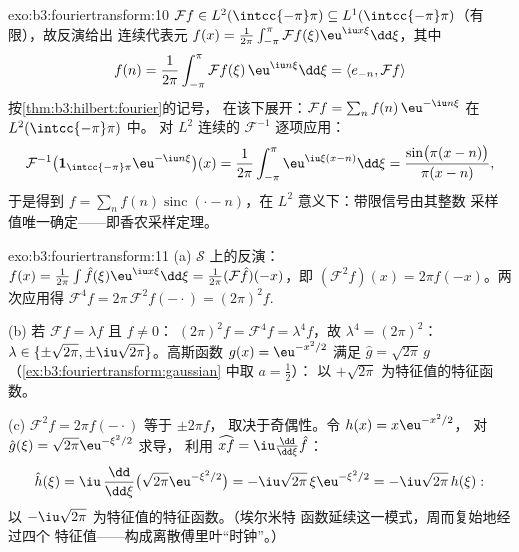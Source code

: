 \begin{solution}{exo:b3:fouriertransform:10}
$\mathcal Ff \in L^2(\intcc{-\pi}\pi) \subseteq
L^1(\intcc{-\pi}\pi)$（有限），故反演给出
连续代表元 $f(x) =
\frac1{2\pi}\int_{-\pi}^\pi\mathcal Ff(\xi)\eu^{\iu
x\xi}\dd\xi$，其中
\[
f(n) = \frac1{2\pi}\int_{-\pi}^{\pi}\mathcal
Ff(\xi)\,\eu^{\iu n\xi}\dd\xi = \langle e_{-n}, \mathcal
Ff\rangle
\]
按\cref{thm:b3:hilbert:fourier}的记号，
在该下展开：$\mathcal Ff = \sum_nf(n)\,\eu^{-\iu
n\xi}$ 在 $L^2(\intcc{-\pi}\pi)$ 中。
对 $L^2$ 连续的 $\mathcal F^{-1}$ 逐项应用：
\[
\mathcal F^{-1}\bigl(\mathbf
1_{\intcc{-\pi}\pi}\eu^{-\iu n\xi}\bigr)(x)
= \frac1{2\pi}\int_{-\pi}^{\pi}\eu^{\iu\xi(x - n)}\dd\xi
= \frac{\sin\bigl(\pi(x-n)\bigr)}{\pi(x - n)} ,
\]
于是得到 $f = \sum_nf(n)\operatorname{sinc}(\cdot - n)$，在
$L^2$ 意义下：带限信号由其整数
采样值唯一确定——即香农采样定理。
\end{solution}

\begin{solution}{exo:b3:fouriertransform:11}
(a) $\mathcal S$ 上的反演：$f(x) =
\frac1{2\pi}\int\hat f(\xi)\eu^{\iu x\xi}\dd\xi =
\frac1{2\pi}(\mathcal F\hat f)(-x)$，即 $(\mathcal
F^2f)(x) = 2\pi f(-x)$。两次应用得 $\mathcal F^4f =
2\pi\,\mathcal F^2f(-\cdot) = (2\pi)^2f$.

(b) 若 $\mathcal Ff = \lambda f$ 且 $f \neq 0$：
$(2\pi)^2f = \mathcal F^4f = \lambda^4f$，故 $\lambda^4 =
(2\pi)^2$：$\lambda \in \{\pm\sqrt{2\pi},
\pm\iu\sqrt{2\pi}\}$。高斯函数 $g(x) = \eu^{-x^2/2}$ 满足
$\hat g = \sqrt{2\pi}\,g$
（\cref{ex:b3:fouriertransform:gaussian} 中取 $a = \frac12$）：
以 $+\sqrt{2\pi}$ 为特征值的特征函数。

(c) $\mathcal F^2f = 2\pi f(-\cdot)$ 等于 $\pm2\pi f$，
取决于奇偶性。令 $h(x) = x\eu^{-x^2/2}$，
对 $\hat g(\xi) = \sqrt{2\pi}\eu^{-\xi^2/2}$ 求导，
利用 $\widehat{xf} = \iu\frac{\dd}{\dd\xi}\hat f$：
\[
\hat h(\xi) = \iu\,\frac{\dd}{\dd\xi}\bigl(\sqrt{2\pi}
\eu^{-\xi^2/2}\bigr) = -\iu\sqrt{2\pi}\,\xi\eu^{-\xi^2/2}
= -\iu\sqrt{2\pi}\,h(\xi) :
\]
以 $-\iu\sqrt{2\pi}$ 为特征值的特征函数。（埃尔米特
函数延续这一模式，周而复始地经过四个
特征值——构成离散傅里叶“时钟”。）

\end{solution}

